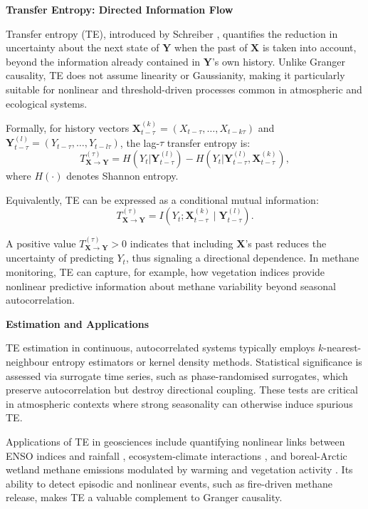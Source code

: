 \textbf{Transfer Entropy: Directed Information Flow}

Transfer entropy (TE), introduced by Schreiber \cite{Schreiber2000}, quantifies the reduction in uncertainty about the next state of $\mathbf{Y}$ when the past of $\mathbf{X}$ is taken into account, beyond the information already contained in $\mathbf{Y}$'s own history. Unlike Granger causality, TE does not assume linearity or Gaussianity, making it particularly suitable for nonlinear and threshold-driven processes common in atmospheric and ecological systems.

Formally, for history vectors $\mathbf{X}^{(k)}_{t-\tau}=(X_{t-\tau},\ldots,X_{t-k\tau})$ and $\mathbf{Y}^{(l)}_{t-\tau}=(Y_{t-\tau},\ldots,Y_{t-l\tau})$, the lag-$\tau$ transfer entropy is:
\begin{equation}
	T_{\mathbf{X} \rightarrow \mathbf{Y}}^{(\tau)} = H(Y_t | \mathbf{Y}^{(l)}_{t-\tau}) - H(Y_t | \mathbf{Y}^{(l)}_{t-\tau},\mathbf{X}^{(k)}_{t-\tau}),
\end{equation}
where $H(\cdot)$ denotes Shannon entropy.

Equivalently, TE can be expressed as a conditional mutual information:
\begin{equation}
	T_{\mathbf{X} \rightarrow \mathbf{Y}}^{(\tau)} = I(Y_t; \mathbf{X}^{(k)}_{t-\tau} \mid \mathbf{Y}^{(l)}_{t-\tau}).
\end{equation}

A positive value $T_{\mathbf{X} \rightarrow \mathbf{Y}}^{(\tau)} > 0$ indicates that including $\mathbf{X}$'s past reduces the uncertainty of predicting $Y_t$, thus signaling a directional dependence. In methane monitoring, TE can capture, for example, how vegetation indices provide nonlinear predictive information about methane variability beyond seasonal autocorrelation.

\textbf{Estimation and Applications}

TE estimation in continuous, autocorrelated systems typically employs $k$-nearest-neighbour entropy estimators \cite{Kraskov2004} or kernel density methods. Statistical significance is assessed via surrogate time series, such as phase-randomised surrogates, which preserve autocorrelation but destroy directional coupling. These tests are critical in atmospheric contexts where strong seasonality can otherwise induce spurious TE.

Applications of TE in geosciences include quantifying nonlinear links between ENSO indices and rainfall \cite{tongal_forecasting_2021}, ecosystem-climate interactions \cite{Benocci2025}, and boreal-Arctic wetland methane emissions modulated by warming and vegetation activity \cite{Knox2024}. Its ability to detect episodic and nonlinear events, such as fire-driven methane release, makes TE a valuable complement to Granger causality.

